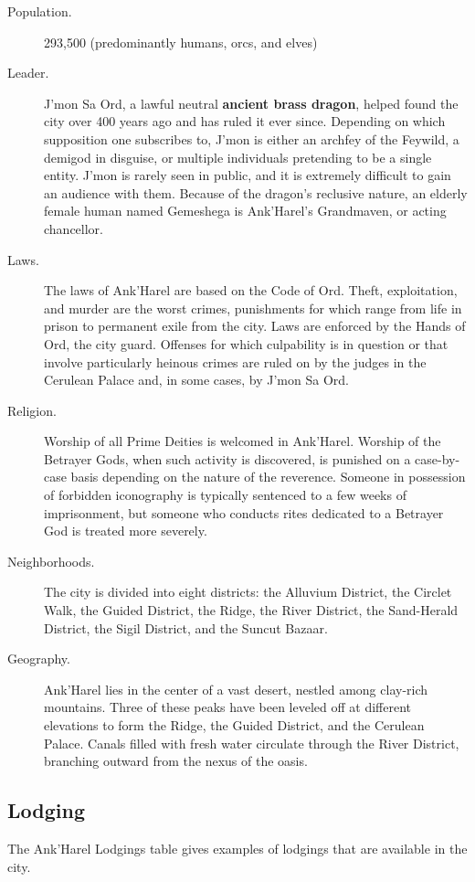 \documentclass[10pt,a4paper,twoside,bg=print,twocolumn,openany,nodeprecatedcode]{dndbook}
\begin{document}
\begin{description}
\item[Population.]
293,500 (predominantly humans, orcs, and elves)
\item[Leader.]
J'mon Sa Ord, a lawful neutral \textbf{ancient brass dragon}, helped found the city over 400 years ago and has ruled it ever since. Depending on which supposition one subscribes to, J'mon is either an archfey of the Feywild, a demigod in disguise, or multiple individuals pretending to be a single entity. J'mon is rarely seen in public, and it is extremely difficult to gain an audience with them. Because of the dragon's reclusive nature, an elderly female human named Gemeshega is Ank'Harel's Grandmaven, or acting chancellor.
\item[Laws.]
The laws of Ank'Harel are based on the Code of Ord. Theft, exploitation, and murder are the worst crimes, punishments for which range from life in prison to permanent exile from the city. Laws are enforced by the Hands of Ord, the city guard. Offenses for which culpability is in question or that involve particularly heinous crimes are ruled on by the judges in the Cerulean Palace and, in some cases, by J'mon Sa Ord.
\item[Religion.]
Worship of all Prime Deities is welcomed in Ank'Harel. Worship of the Betrayer Gods, when such activity is discovered, is punished on a case-by-case basis depending on the nature of the reverence. Someone in possession of forbidden iconography is typically sentenced to a few weeks of imprisonment, but someone who conducts rites dedicated to a Betrayer God is treated more severely.
\item[Neighborhoods.]
The city is divided into eight districts: the Alluvium District, the Circlet Walk, the Guided District, the Ridge, the River District, the Sand-Herald District, the Sigil District, and the Suncut Bazaar.
\item[Geography.]
Ank'Harel lies in the center of a vast desert, nestled among clay-rich mountains. Three of these peaks have been leveled off at different elevations to form the Ridge, the Guided District, and the Cerulean Palace. Canals filled with fresh water circulate through the River District, branching outward from the nexus of the oasis.
\end{description}

\subsection{Lodging}
The Ank'Harel Lodgings table gives examples of lodgings that are available in the city.
\end{document}
